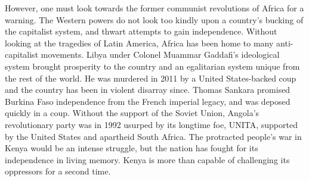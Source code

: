\documentclass[american]{../../../coursework}
\begin{document}
However, one must look towards the former communist revolutions of Africa for
a warning. The Western powers do not look too kindly upon a country's bucking
of the capitalist system, and thwart attempts to gain independence. Without
looking at the tragedies of Latin America, Africa has been home to many
anti-capitalist movements. Libya under Colonel Muammar Gaddafi's ideological
system brought prosperity to the country and an egalitarian system unique from
the rest of the world. He was murdered in 2011 by a United States-backed coup
and the country has been in violent disarray since. Thomas Sankara promised
Burkina Faso independence from the French imperial legacy, and was deposed
quickly in a coup. Without the support of the Soviet Union, Angola's
revolutionary party was in 1992 usurped by its longtime foe, UNITA, supported
by the United States and apartheid South Africa. The protracted people's war
in Kenya would be an intense struggle, but the nation has fought for its
independence in living memory. Kenya is more than capable of challenging its
oppressors for a second time.

\printbibliography
\end{document}
